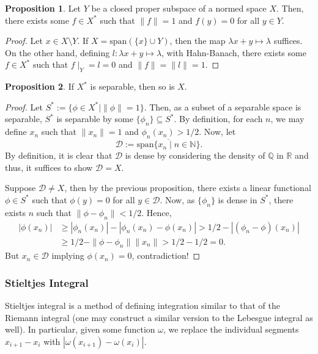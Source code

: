 \documentclass[]{article}
\theoremstyle{definition}
\theoremstyle{definition}
\newtheorem{proposition}{Proposition}[section]
\begin{document}
\begin{proposition}
  Let \(Y\) be a closed proper subspace of a normed space \(X\). Then, there 
  exists some \(f \in X^*\) such that \(\|f\| = 1\) and \(f(y) = 0\) for all 
  \(y \in Y\).
\end{proposition}
\begin{proof}
  Let \(x \in X \setminus Y\). If \(X = \text{span}(\{x\} \cup Y)\), then 
  the map \(\lambda x + y \mapsto \lambda\) suffices. On the other hand, 
  defining \(l : \lambda x + y \mapsto \lambda\), with Hahn-Banach, there exists 
  some \(f \in X^*\) such that \(f\mid_Y = l = 0\) and \(\|f\| = \|l\| = 1\).
\end{proof}

\begin{proposition}
  If \(X^*\) is separable, then so is \(X\).
\end{proposition}
\begin{proof}
  Let \(S^* := \{ \phi \in X^* \mid \|\phi\| = 1\}\). Then, as a subset of a 
  separable space is separable, \(S^*\) is separable by some
  \(\{\phi_n\} \subseteq S^*\). By definition, for each \(n\), we may define 
  \(x_n\) such that \(\|x_n\| = 1\) and \(\phi_n(x_n) > 1 / 2\). Now, 
  let 
  \[\mathcal{D} := \overline{\text{span}\{x_n \mid n \in \mathbb{N}\}}.\]
  By definition, it is clear that \(\mathcal{D}\) is dense by considering 
  the density of \(\mathbb{Q}\) in \(\mathbb{R}\) and thus, it suffices to 
  show \(\mathcal{D} = X\). 

  Suppose \(\mathcal{D} \neq X\), then by the previous proposition, 
  there exists a linear functional \(\phi \in S^*\) such that \(\phi(y) = 0\) 
  for all \(y \in \mathcal{D}\). Now, as \(\{\phi_n\}\) is dense in \(S^*\), 
  there exists \(n\) such that \(\|\phi - \phi_n\| < 1/2\). Hence,
  \[\begin{split}
    |\phi(x_n)| & \ge |\phi_n(x_n)| - |\phi_n(x_n) - \phi(x_n)| 
      > 1/2 - |(\phi_n - \phi)(x_n)| \\
    & \ge 1 / 2 - \|\phi - \phi_n\| \|x_n\| > 1 / 2 - 1 / 2 = 0.
  \end{split}\]
  But \(x_n \in \mathcal{D}\) implying \(\phi(x_n) = 0\), contradiction!
\end{proof}

\subsubsection{Stieltjes Integral}

Stieltjes integral is a method of defining integration similar to that 
of the Riemann integral (one may construct a similar version to the Lebesgue 
integral as well). In particular, given some function \(\omega\), 
we replace the individual segments \(x_{i + 1} - x_i\) with 
\(|\omega(x_{i + 1}) - \omega(x_i)|\).
\end{document}
